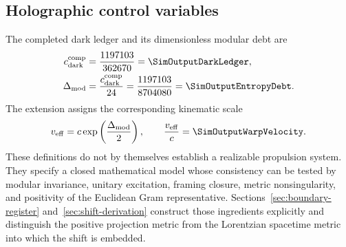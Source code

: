 \subsection{Holographic control variables}

The completed dark ledger and its dimensionless modular debt are
\begin{equation}
  \begin{aligned}
  c_{\mathrm{dark}}^{\mathrm{comp}}
  &=
  \frac{1197103}{362670}
  =
  \SimOutputDarkLedger,
  \\
  \Delta_{\mathrm{mod}}
  &=
  \frac{c_{\mathrm{dark}}^{\mathrm{comp}}}{24}
  =
  \frac{1197103}{8704080}
  =
  \SimOutputEntropyDebt.
  \end{aligned}
  \label{eq:intro-dark-ledger}
\end{equation}
The extension assigns the corresponding kinematic scale
\begin{equation}
  v_{\mathrm{eff}}
  =
  c\exp\left(\frac{\Delta_{\mathrm{mod}}}{2}\right),
  \qquad
  \frac{v_{\mathrm{eff}}}{c}
  =
  \SimOutputWarpVelocity.
  \label{eq:intro-effective-velocity}
\end{equation}
These definitions do not by themselves establish a realizable propulsion system.  They specify a closed mathematical model whose consistency can be tested by modular invariance, unitary excitation, framing closure, metric nonsingularity, and positivity of the Euclidean Gram representative.  Sections~\ref{sec:boundary-register} and~\ref{sec:shift-derivation} construct those ingredients explicitly and distinguish the positive projection metric from the Lorentzian spacetime metric into which the shift is embedded.